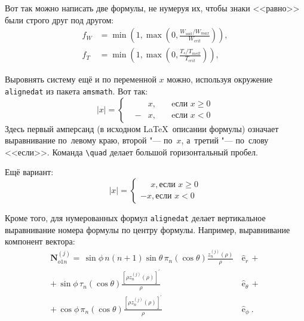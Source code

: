 Вот так можно написать две формулы, не нумеруя их, чтобы знаки <<равно>> были
строго друг под другом:
\begin{align}
    f_W & =  \min \left( 1, \max \left( 0, \frac{W_{soil} / W_{max}}{W_{crit}} \right)  \right), \nonumber \\
    f_T & =  \min \left( 1, \max \left( 0, \frac{T_s / T_{melt}}{T_{crit}} \right)  \right), \nonumber
\end{align}

Выровнять систему ещё и по переменной \( x \) можно, используя окружение
\verb|alignedat| из пакета \verb|amsmath|. Вот так:
\[
|x| = \left\{
\begin{alignedat}{2}
    &&x, \quad &\text{eсли } x\geqslant 0 \\
    &-&x, \quad & \text{eсли } x<0
\end{alignedat}
\right.
\]
Здесь первый амперсанд (в исходном \LaTeX\ описании формулы) означает
выравнивание по~левому краю, второй "--- по~\( x \), а~третий "--- по~слову
<<если>>. Команда \verb|\quad| делает большой горизонтальный пробел.

Ещё вариант:
\[
    |x|=
    \begin{cases}
        \phantom{-}x, \text{если } x \geqslant 0 \\
        -x, \text{если } x<0
    \end{cases}
\]

Кроме того, для  нумерованных формул \verb|alignedat| делает вертикальное
выравнивание номера формулы по центру формулы. Например, выравнивание
компонент вектора:
\begin{equation}
    \label{eq:2p3}
    \begin{alignedat}{2}
        {\mathbf{N}}_{o1n}^{(j)} = \,{\sin} \phi\,n\!\left(n+1\right)
        {\sin}\theta\,
        \pi_n\!\left({\cos} \theta\right)
        \frac{
        z_n^{(j)}\!\left( \rho \right)
        }{\rho}\,
        &{\boldsymbol{\hat{\mathrm e}}}_{r}\,+   \\
        +\,
        {\sin} \phi\,
        \tau_n\!\left({\cos} \theta\right)
        \frac{
        \left[\rho z_n^{(j)}\!\left( \rho \right)\right]^{\prime}
        }{\rho}\,
        &{\boldsymbol{\hat{\mathrm e}}}_{\theta}\,+   \\
        +\,
        {\cos} \phi\,
        \pi_n\!\left({\cos} \theta\right)
        \frac{
        \left[\rho z_n^{(j)}\!\left( \rho \right)\right]^{\prime}
        }{\rho}\,
        &{\boldsymbol{\hat{\mathrm e}}}_{\phi}\:.
    \end{alignedat}
\end{equation}

